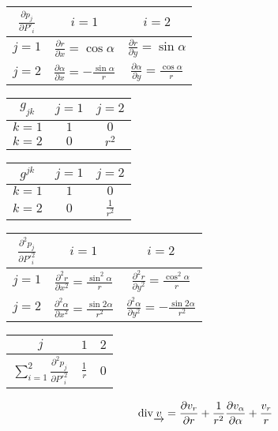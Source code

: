 \begin{tabular}{| c || c | c |}
\hline
\(\frac{\partial p_j}{\partial P'_i}\) & \(i=1\) & \(i=2\) \\
\hline
\hline
\(j=1\) & \(\frac{\partial r}{\partial x} = \cos \alpha\) & \(\frac{\partial r}{\partial y} = \sin \alpha\) \\
\hline
\(j=2\) & \(\frac{\partial \alpha}{\partial x} = -\frac{\sin \alpha}{r}\) & \(\frac{\partial \alpha}{\partial y} = \frac{\cos \alpha}{r}\) \\
\hline
\end{tabular}

\begin{tabular}{| c || c | c |}
\hline
\(g_{jk}\) & \(j=1\) & \(j=2\) \\
\hline
\hline
\(k=1\) & \(1\) & \(0\) \\
\hline
\(k=2\) & \(0\) & \(r^2\) \\
\hline
\end{tabular}

\begin{tabular}{| c || c | c |}
\hline
\(g^{jk}\) & \(j=1\) & \(j=2\) \\
\hline
\hline
\(k=1\) & \(1\) & \(0\) \\
\hline
\(k=2\) & \(0\) & \(\frac{1}{r^2}\) \\
\hline
\end{tabular}

\begin{tabular}{| c || c | c |}
\hline
\(\frac{\partial^2 p_j}{\partial P'^2_i}\) & \(i=1\) & \(i=2\) \\
\hline
\hline
\(j=1\) & \(\frac{\partial^2 r}{\partial x^2} = \frac{\sin^2 \alpha}{r}\) & \(\frac{\partial^2 r}{\partial y^2} = \frac{\cos^2 \alpha}{r}\) \\
\hline
\(j=2\) & \(\frac{\partial^2 \alpha}{\partial x^2} = \frac{\sin 2\alpha}{r^2}\) & \(\frac{\partial^2 \alpha}{\partial y^2} = -\frac{\sin 2\alpha}{r^2}\) \\
\hline
\end{tabular}

\begin{tabular}{| c || c | c |}
\hline
\(j\) & \(1\) & \(2\) \\
\hline
\hline
\(\sum_{i=1}^2 \frac{\partial^2 p_j}{\partial P'^2_i}\) & \(\frac{1}{r}\) & 0 \\
\hline
\end{tabular}

\begin{equation}
\label{eq:polarni_ss_div}
\mathrm{div}{\underrightarrow{v}} = \frac{\partial v_r}{\partial r} + \frac{1}{r^2} \frac{\partial v_{\alpha}}{\partial \alpha} + \frac{v_r}{r}
\end{equation}


